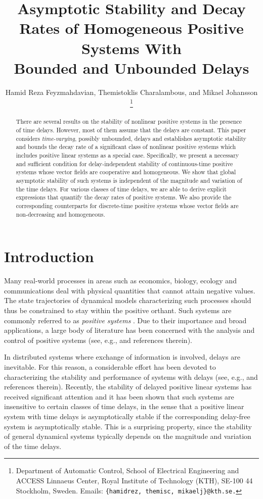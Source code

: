 \documentclass[11pt,draftclsnofoot,onecolumn]{IEEEtran}
\title{Asymptotic Stability and Decay Rates of Homogeneous Positive Systems With\\ Bounded and Unbounded Delays}
\author{Hamid Reza Feyzmahdavian, Themistoklis Charalambous, and Mikael Johansson
\thanks{Department of Automatic Control, School of Electrical Engineering and ACCESS Linnaeus Center, Royal Institute of Technology (KTH), SE-100 44 Stockholm, Sweden.
Emails: {\tt \{hamidrez, themisc, mikaelj\}@kth.se.}}
}
\begin{document}
\maketitle




\begin{abstract}
There are several results on the stability of nonlinear positive systems in the presence of time delays. However, most of them assume that the delays are constant. This paper considers {\em time-varying}, possibly unbounded, delays and establishes asymptotic stability and bounds the decay rate of a significant class of nonlinear positive systems which includes positive linear systems as a special case. Specifically, we present a necessary and sufficient condition for delay-independent stability of continuous-time positive systems whose vector fields are cooperative and homogeneous. We show that global asymptotic stability of such systems is independent of the magnitude and variation of the time delays. For various classes of time delays, we are able to derive explicit expressions that quantify the decay rates of positive systems. We also provide the corresponding counterparts for discrete-time positive systems whose vector fields are non-decreasing and homogeneous.
\end{abstract}




\section{Introduction}\label{sec:intro}

Many real-world processes in areas such as economics, biology, ecology and communications deal with physical quantities that cannot attain negative values. The state trajectories of dynamical models characterizing such processes should thus be constrained to stay within the positive orthant. Such systems are commonly referred to as {\em positive systems} \cite{Smith:95,Farina:00,Haddad:10}. Due to their importance and broad applications, a large body of literature has been concerned with the analysis and control of positive systems (see, e.g., \cite{Jacquez:93,Valcher:97,Van:98,Leenheer:01,Aeyels:02,Dashkovski:06,Rami:07,Mason:07,Ngoc:09,Fainshil:09,2009:Florian,Ruffer:10,Rantzer:11,Tanaka:11,Fornasini:11,
li:11,Ebihara:13,Feyzmahdavian:13-0,Briat:13} and references therein).

In distributed systems where exchange of information is involved, delays are inevitable. For this reason,  a considerable effort has been devoted to characterizing the stability and performance of systems with delays (see, e.g., \cite{Hale:93,Fridman:02,Wu:04,Gao:07,He:07,Peet:09,Sipahi:11} and references therein). Recently, the stability of delayed positive linear systems has received significant attention \cite{Ngoc:06,Liu:09,Rami:09,Liu:10,Haddad:04} and it has been shown that such systems are insensitive to certain classes of time delays, in the sense that a positive linear system with time delays is asymptotically stable if the corresponding delay-free system is asymptotically stable. This is a surprising property, since the stability of general dynamical systems typically depends on the magnitude and variation of the time delays.
\end{document}
